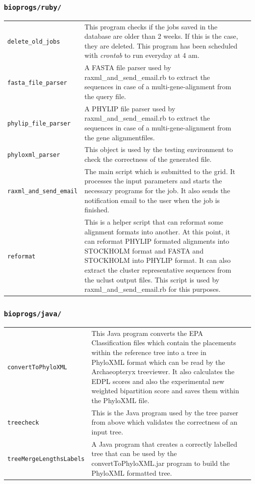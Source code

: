 \documentclass{scrartcl}
\begin{document}
				\subsubsection{\texttt{bioprogs/ruby/}}
					\begin{tabular}[c]{lp{9.8cm}l}
						\texttt{delete\_old\_jobs}  & This program checks if the jobs saved in the database are older than 2 weeks. If this is the case, they are deleted. This  program has been scheduled with \textit{crontab} to run everyday at 4 am. \\
						\texttt{fasta\_file\_parser}  &  A FASTA file parser used by raxml\_and\_send\_email.rb to extract the sequences in case of a multi-gene-alignment from the query file.\\
						\texttt{phylip\_file\_parser}  & A PHYLIP file parser used by raxml\_and\_send\_email.rb to extract the sequences in case of a multi-gene-alignment from the gene alignmentfiles. \\
						\texttt{phyloxml\_parser}  & This object is used by the testing environment to check the correctness of the generated file. \\
						\texttt{raxml\_and\_send\_email}  & The main script which is submitted to the grid. It processes the input parameters and starts the necessary programs for the job. It also sends the notification email to the user when the job is finished. \\
						\texttt{reformat}  & This is a helper script that can reformat some alignment formats into another. At this point, it can reformat PHYLIP formated alignments into  STOCKHOLM format and FASTA and STOCKHOLM into PHYLIP format. It can also extract the cluster representative sequences from the uclust output files. This script is used by raxml\_and\_send\_email.rb for this purposes.\\ 
					\end{tabular}
				\subsubsection{\texttt{bioprogs/java/}}
					\begin{tabular}[c]{lp{9.2cm}l}
						\texttt{convertToPhyloXML}  & This Java program converts the EPA Classification files which contain the placements within the reference tree into a tree in PhyloXML format which can be read by the Archaeopteryx treeviewer. It also calculates the EDPL scores and also the experimental new weighted bipartition score and saves them within the PhyloXML file. \\
						\texttt{treecheck}  & This is the Java program used by the tree parser from above which validates the correctness of an input tree. \\
						\texttt{treeMergeLengthsLabels}  & A Java program that creates a correctly labelled tree  that can be used by the convertToPhyloXML.jar program to build the PhyloXML formatted tree.  \\
					\end{tabular}
\end{document}
